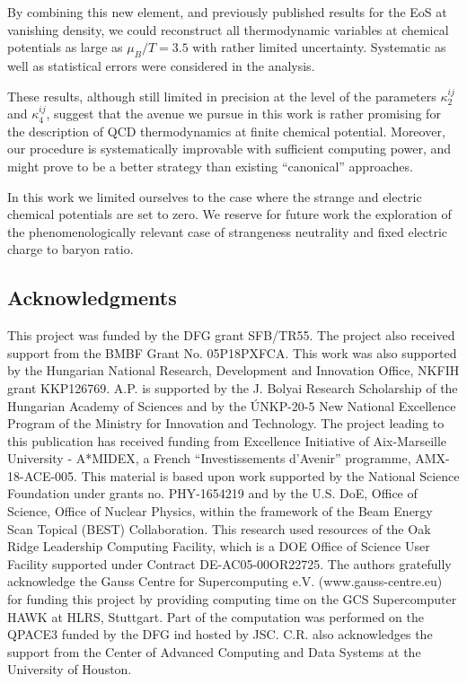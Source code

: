 \documentclass[aps,prd,twocolumn,superscriptaddress]{revtex4-2}
\begin{document}
By combining this new element, and previously published results for the EoS at vanishing density, we 
could reconstruct all thermodynamic variables at chemical potentials as large as
$\mu_B/T = 3.5$ with rather limited uncertainty. Systematic as well as statistical errors
were considered in the analysis. 

These results, although still limited in precision at the level of the parameters 
$\kappa_2^{ij}$ and $\kappa_4^{ij}$, suggest that the avenue we pursue in this work is 
rather promising for the description of QCD thermodynamics at finite chemical 
potential. Moreover, our procedure is systematically improvable with sufficient 
computing power, and might prove to be a better strategy than existing ``canonical''
approaches.

In this work we limited ourselves to the case where the strange and electric
chemical potentials are set to zero. We reserve for future work the exploration
of the phenomenologically relevant case of strangeness neutrality and
fixed electric charge to baryon ratio.


\subsection*{Acknowledgments}
This project was funded by the DFG grant SFB/TR55.
The project also received support from the BMBF Grant No. 05P18PXFCA.
This work was also supported by
the Hungarian National Research,  Development and Innovation Office, NKFIH
grant KKP126769. A.P. is supported by the J. Bolyai Research
Scholarship of the Hungarian Academy of Sciences and by the \'UNKP-20-5 New
National Excellence Program of the Ministry for Innovation and Technology.
The project leading to this publication has received funding from
Excellence Initiative of
Aix-Marseille University - A*MIDEX, a French ``Investissements d'Avenir''
programme, AMX-18-ACE-005.
This  material is based upon  work  supported  by  the National  Science
Foundation under grants no. PHY-1654219 and by the U.S. DoE, %
Office  of  Science,  Office  of  Nuclear  Physics, within the framework of the
Beam Energy Scan Topical (BEST) Collaboration.  
This research used resources of the Oak Ridge Leadership Computing Facility, which is a DOE Office of Science User Facility supported under Contract DE-AC05-00OR22725. 
The authors gratefully
acknowledge the Gauss Centre for Supercomputing e.V.  (www.gauss-centre.eu) for
funding this project by providing computing time on the GCS Supercomputer
HAWK at HLRS, Stuttgart. 
Part of the computation was performed on the QPACE3 funded by the DFG ind
hosted by JSC.
C.R. also acknowledges the support from the Center of Advanced
Computing and Data Systems at the University of Houston.


\end{document}
